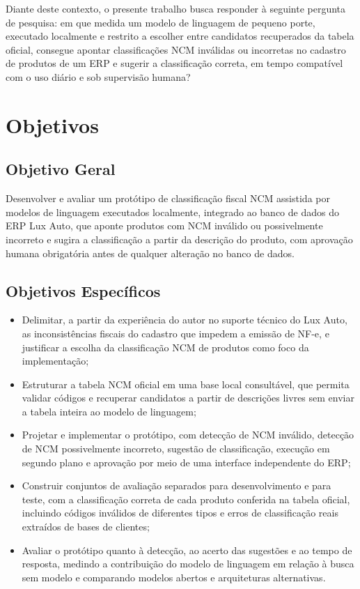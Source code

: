 Diante deste contexto, o presente trabalho busca responder à seguinte pergunta de pesquisa: em que medida um modelo de linguagem de pequeno porte, executado localmente e restrito a escolher entre candidatos recuperados da tabela oficial, consegue apontar classificações NCM inválidas ou incorretas no cadastro de produtos de um ERP e sugerir a classificação correta, em tempo compatível com o uso diário e sob supervisão humana?

\section{Objetivos}

\subsection{Objetivo Geral}

Desenvolver e avaliar um protótipo de classificação fiscal NCM assistida por modelos de linguagem executados localmente, integrado ao banco de dados do ERP Lux Auto, que aponte produtos com NCM inválido ou possivelmente incorreto e sugira a classificação a partir da descrição do produto, com aprovação humana obrigatória antes de qualquer alteração no banco de dados.

\subsection{Objetivos Específicos}

\begin{itemize}
    \item Delimitar, a partir da experiência do autor no suporte técnico do Lux Auto, as inconsistências fiscais do cadastro que impedem a emissão de NF-e, e justificar a escolha da classificação NCM de produtos como foco da implementação;
    \item Estruturar a tabela NCM oficial em uma base local consultável, que permita validar códigos e recuperar candidatos a partir de descrições livres sem enviar a tabela inteira ao modelo de linguagem;
    \item Projetar e implementar o protótipo, com detecção de NCM inválido, detecção de NCM possivelmente incorreto, sugestão de classificação, execução em segundo plano e aprovação por meio de uma interface independente do ERP;
    \item Construir conjuntos de avaliação separados para desenvolvimento e para teste, com a classificação correta de cada produto conferida na tabela oficial, incluindo códigos inválidos de diferentes tipos e erros de classificação reais extraídos de bases de clientes;
    \item Avaliar o protótipo quanto à detecção, ao acerto das sugestões e ao tempo de resposta, medindo a contribuição do modelo de linguagem em relação à busca sem modelo e comparando modelos abertos e arquiteturas alternativas.
\end{itemize}

